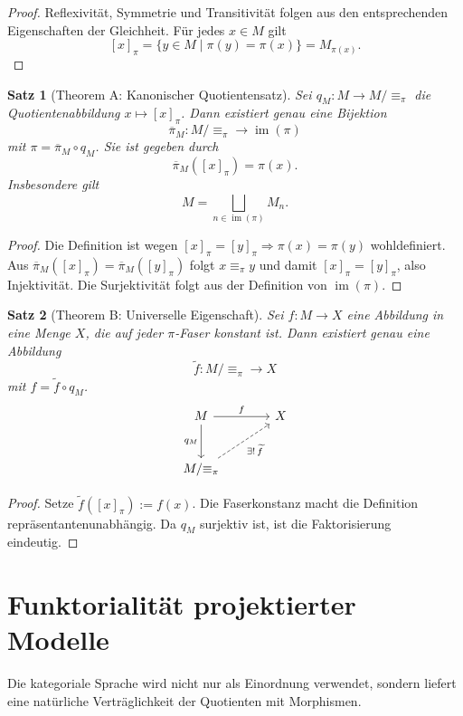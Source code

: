 \documentclass[11pt,a4paper,reqno]{amsart}
\newtheorem{theorem}{Satz}[section]
\theoremstyle{definition}
\theoremstyle{remark}
\newcommand{\im}{\operatorname{im}}
\newcommand{\eqpi}{\mathrel{\equiv_{\pi}}}
\begin{document}
\begin{proof}
Reflexivität, Symmetrie und Transitivität folgen aus den entsprechenden Eigenschaften der Gleichheit. Für jedes $x\in M$ gilt
\[
  [x]_\pi=\{y\in M\mid \pi(y)=\pi(x)\}=M_{\pi(x)}.
\]
\end{proof}

\begin{theorem}[Theorem A: Kanonischer Quotientensatz]
\label{thm:quotient}
Sei $q_M\colon M\to M/{\equiv_\pi}$ die Quotientenabbildung $x\mapsto[x]_\pi$. Dann existiert genau eine Bijektion
\[
  \overline\pi_M\colon M/{\equiv_\pi}\longrightarrow\im(\pi)
\]
mit $\pi=\overline\pi_M\circ q_M$. Sie ist gegeben durch
\[
  \overline\pi_M([x]_\pi)=\pi(x).
\]
Insbesondere gilt
\[
  M=\bigsqcup_{n\in\im(\pi)}M_n.
\]
\end{theorem}

\begin{proof}
Die Definition ist wegen $[x]_\pi=[y]_\pi\Rightarrow\pi(x)=\pi(y)$ wohldefiniert. Aus $\overline\pi_M([x]_\pi)=\overline\pi_M([y]_\pi)$ folgt $x\eqpi y$ und damit $[x]_\pi=[y]_\pi$, also Injektivität. Die Surjektivität folgt aus der Definition von $\im(\pi)$.
\end{proof}

\begin{theorem}[Theorem B: Universelle Eigenschaft]
\label{thm:universal}
Sei $f\colon M\to X$ eine Abbildung in eine Menge $X$, die auf jeder $\pi$-Faser konstant ist. Dann existiert genau eine Abbildung
\[
  \widetilde f\colon M/{\equiv_\pi}\longrightarrow X
\]
mit $f=\widetilde f\circ q_M$.
\[
\begin{tikzcd}[column sep=large,row sep=large]
M \arrow[r,"f"] \arrow[d,"q_M"'] & X\\
M/{\equiv_\pi} \arrow[ur,dashed,"\exists!\,\widetilde f"'] &
\end{tikzcd}
\]
\end{theorem}

\begin{proof}
Setze $\widetilde f([x]_\pi):=f(x)$. Die Faserkonstanz macht die Definition repräsentantenunabhängig. Da $q_M$ surjektiv ist, ist die Faktorisierung eindeutig.
\end{proof}

\section{Funktorialität projektierter Modelle}

Die kategoriale Sprache wird nicht nur als Einordnung verwendet, sondern liefert eine natürliche Verträglichkeit der Quotienten mit Morphismen.
\end{document}
